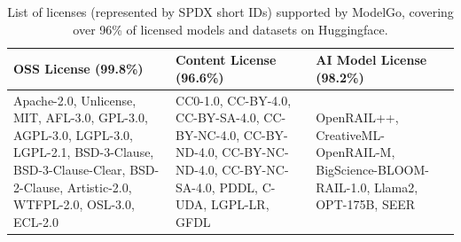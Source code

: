 \clearpage

\begin{table}[h]
  \caption{List of licenses (represented by SPDX short IDs) supported by ModelGo, covering over 96\% of licensed models and datasets on Huggingface.}
  \scriptsize
  \label{tab:list}
  \begin{tabular}{|p{2.45cm}|p{2.45cm}|p{2.45cm}|}
  \hline
  \rowcolor[gray]{.8}
  \textbf{OSS License} (99.8\%) & \textbf{Content License} (96.6\%) & \textbf{AI Model License} (98.2\%)\\ \hline
  Apache-2.0, Unlicense, MIT, AFL-3.0, GPL-3.0, AGPL-3.0, LGPL-3.0, LGPL-2.1, BSD-3-Clause, BSD-3-Clause-Clear, BSD-2-Clause, Artistic-2.0, WTFPL-2.0, OSL-3.0, ECL-2.0
  &
  CC0-1.0, CC-BY-4.0, CC-BY-SA-4.0, CC-BY-NC-4.0, CC-BY-ND-4.0, CC-BY-NC-ND-4.0, CC-BY-NC-SA-4.0, PDDL, C-UDA, LGPL-LR, GFDL
  & 
  OpenRAIL++, CreativeML-OpenRAIL-M, BigScience-BLOOM-RAIL-1.0, Llama2, OPT-175B, SEER
  \\ \hline

  \end{tabular}
\end{table}

